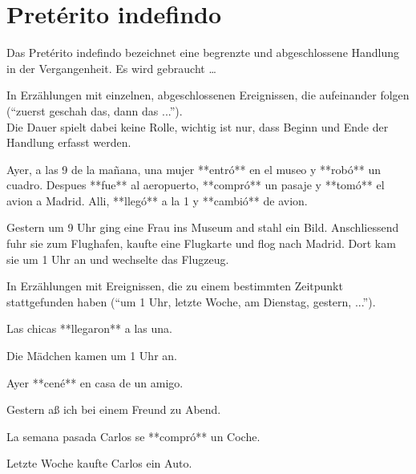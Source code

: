 \section*{Pretérito indefindo}

Das Pretérito indefindo bezeichnet eine begrenzte und abgeschlossene Handlung
in der Vergangenheit.
Es wird gebraucht \ldots

\begin{highlight}
In Erzählungen mit einzelnen, abgeschlossenen Ereignissen,
die aufeinander folgen ("`zuerst geschah das, dann das ..."'). \\
Die Dauer spielt dabei keine Rolle, wichtig ist nur, dass Beginn und Ende der
Handlung erfasst werden.
\end{highlight}

\begin{compactitem}
    \item Ayer, a las 9 de la mañana, una mujer **entró** en el museo y **robó** un
          cuadro. Despues **fue** al aeropuerto, **compró** un pasaje y **tomó** el
          avion a Madrid. Alli, **llegó** a la 1 y **cambió** de avion.
    \begin{compactitem}
        \item Gestern um 9 Uhr ging eine Frau ins Museum and stahl ein Bild. Anschliessend
              fuhr sie zum Flughafen, kaufte eine Flugkarte und flog nach Madrid.
              Dort kam sie um 1 Uhr an und wechselte das Flugzeug.
    \end{compactitem}
\end{compactitem}

\begin{highlight}
In Erzählungen mit Ereignissen, die zu einem bestimmten
Zeitpunkt stattgefunden haben ("`um 1 Uhr, letzte Woche, am Dienstag,
gestern, ..."').
\end{highlight}

\begin{compactitem}
    \item Las chicas **llegaron** a las una.
    \begin{compactitem}\itshape
        \item Die Mädchen kamen um 1 Uhr an.
    \end{compactitem}
    \item Ayer **cené** en casa de un amigo.
    \begin{compactitem}\itshape
        \item  Gestern aß ich bei einem Freund zu Abend.
    \end{compactitem}
    \item La semana pasada Carlos se **compró** un Coche.
    \begin{compactitem}\itshape
        \item Letzte Woche kaufte Carlos ein Auto.
    \end{compactitem}
\end{compactitem}


